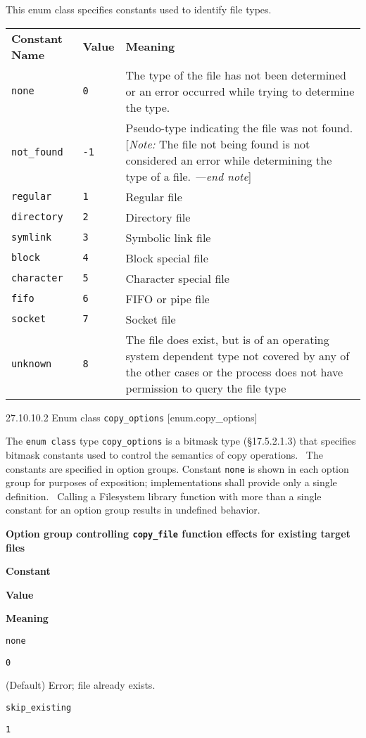 This enum class specifies constants used to identify file types.

\begin{longtable}[c]{@{}lll@{}}
\toprule
\textbf{Constant Name} & \textbf{Value} &
\textbf{Meaning}\tabularnewline
\texttt{none} & \texttt{0} & The type of the file has not been
determined or an error occurred while trying to determine the
type.\tabularnewline
\texttt{not\_found} & \texttt{-1} & Pseudo-type indicating the file was
not found. {[}\emph{Note:} The file not being found is not considered an
error while determining the type of a file. \emph{---end
note}{]}\tabularnewline
\texttt{regular} & \texttt{1} & Regular file\tabularnewline
\texttt{directory} & \texttt{2} & Directory file\tabularnewline
\texttt{symlink} & \texttt{3} & Symbolic link file\tabularnewline
\texttt{block} & \texttt{4} & Block special file\tabularnewline
\texttt{character} & \texttt{5} & Character special file\tabularnewline
\texttt{fifo} & \texttt{6} & FIFO or pipe file\tabularnewline
\texttt{socket} & \texttt{7} & Socket file\tabularnewline
\texttt{unknown} & \texttt{8} & The file does exist, but is of an
operating system dependent type not covered by any of the other cases or
the process does not have permission to query the file
type\tabularnewline
\bottomrule
\end{longtable}

27.10.10.2 Enum class \texttt{copy\_options} {[}enum.copy\_options{]}

The \texttt{enum\ class} type \texttt{copy\_options} is a bitmask type
(§17.5.2.1.3) that specifies bitmask constants used to control the
semantics of copy operations.~ The constants are specified in option
groups. Constant \texttt{none} is shown in each option group for
purposes of exposition; implementations shall provide only a single
definition.~ Calling a Filesystem library function with more than a
single constant for an option group results in undefined behavior.

\textbf{Option group controlling \texttt{copy\_file} function effects
for existing target files}

\textbf{Constant}

\textbf{Value}

\textbf{Meaning}

\texttt{none}

\texttt{0}

(Default) Error; file already exists.

\texttt{skip\_existing}

\texttt{1}


